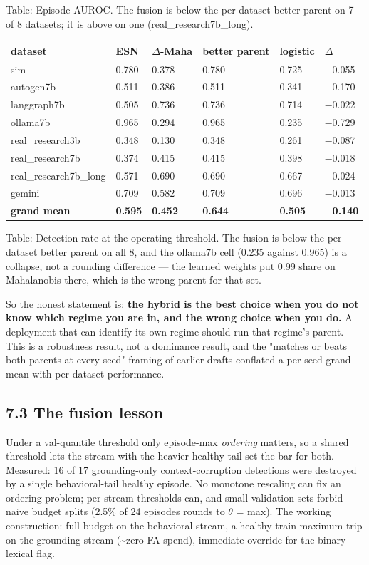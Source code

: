 \documentclass[11pt]{article}
\begin{document}
Table: Episode AUROC. The fusion is below the per-dataset better parent on 7 of 8 datasets; it is above on one (real\_research7b\_long).


\begin{longtable}{llllll}
\toprule
\textbf{dataset} & \textbf{ESN} & \textbf{$\Delta$-Maha} & \textbf{better parent} & \textbf{logistic} & \textbf{$\Delta$} \\
\midrule
\endhead
sim & 0.780 & 0.378 & 0.780 & 0.725 & $-$0.055 \\
autogen7b & 0.511 & 0.386 & 0.511 & 0.341 & $-$0.170 \\
langgraph7b & 0.505 & 0.736 & 0.736 & 0.714 & $-$0.022 \\
ollama7b & 0.965 & 0.294 & 0.965 & 0.235 & $-$0.729 \\
real\_research3b & 0.348 & 0.130 & 0.348 & 0.261 & $-$0.087 \\
real\_research7b & 0.374 & 0.415 & 0.415 & 0.398 & $-$0.018 \\
real\_research7b\_long & 0.571 & 0.690 & 0.690 & 0.667 & $-$0.024 \\
gemini & 0.709 & 0.582 & 0.709 & 0.696 & $-$0.013 \\
\textbf{grand mean} & \textbf{0.595} & \textbf{0.452} & \textbf{0.644} & \textbf{0.505} & \textbf{$-$0.140} \\
\bottomrule
\end{longtable}


Table: Detection rate at the operating threshold. The fusion is below the per-dataset better parent on all 8, and the ollama7b cell (0.235 against 0.965) is a collapse, not a rounding difference --- the learned weights put 0.99 share on Mahalanobis there, which is the wrong parent for that set.


So the honest statement is: \textbf{the hybrid is the best choice when you do not know which regime you are in, and the wrong choice when you do.} A deployment that can identify its own regime should run that regime's parent. This is a robustness result, not a dominance result, and the "matches or beats both parents at every seed" framing of earlier drafts conflated a per-seed grand mean with per-dataset performance.


\subsection{7.3 The fusion lesson}


Under a val-quantile threshold only episode-max \emph{ordering} matters, so a shared threshold lets the stream with the heavier healthy tail set the bar for both. Measured: 16 of 17 grounding-only context-corruption detections were destroyed by a single behavioral-tail healthy episode. No monotone rescaling can fix an ordering problem; per-stream thresholds can, and small validation sets forbid naive budget splits (2.5\% of 24 episodes rounds to $\theta$ = max). The working construction: full budget on the behavioral stream, a healthy-train-maximum trip on the grounding stream (\textasciitilde{}zero FA spend), immediate override for the binary lexical flag.
\end{document}
